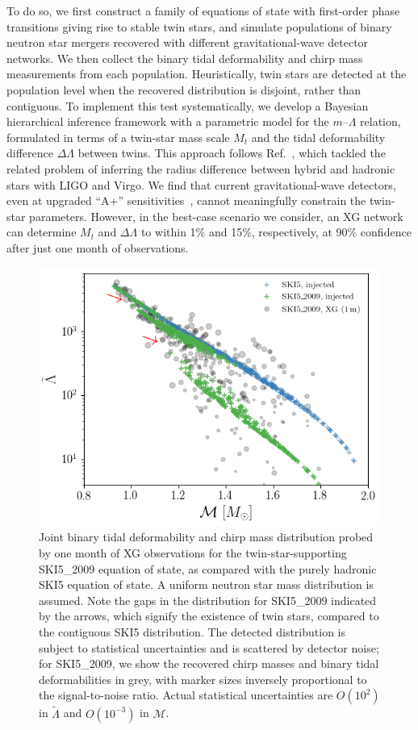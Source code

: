 \documentclass[aps,prd,twocolumn,superscriptaddress,nofootinbib]{revtex4-1}
\begin{document}
To do so, we first construct a family of equations of state with first-order phase transitions giving rise to stable twin stars, and simulate populations of binary neutron star mergers recovered with different gravitational-wave detector networks. We then collect the binary tidal deformability and chirp mass measurements from each population. Heuristically, twin stars are detected at the population level when the recovered distribution is disjoint, rather than contiguous. To implement this test systematically, we develop a Bayesian hierarchical inference framework with a parametric model for the $m$--$\Lambda$ relation, formulated in terms of a twin-star mass scale $M_t$ and the tidal deformability difference $\Delta\Lambda$ between twins. This approach follows Ref.~\cite{ChatziioannouHan2020}, which tackled the related problem of inferring the radius difference between hybrid and hadronic stars with LIGO and Virgo.
We find that current gravitational-wave detectors, even at upgraded ``A+'' sensitivities~\cite{AbbottAbbott2018_ObservingScenarios}, cannot meaningfully constrain the twin-star parameters. However, in the best-case scenario we consider, an XG network can determine $M_t$ and $\Delta\Lambda$ to within 1\% and 15\%, respectively, at 90\% confidence after just one month of observations.

\begin{figure}[t]
    \centering
    \includegraphics[width=0.95\columnwidth]{SKI52009_pop.png}
    \caption{Joint binary tidal deformability and chirp mass distribution probed by one month of XG observations for the twin-star-supporting SKI5\_2009 equation of state, as compared with the purely hadronic SKI5 equation of state. A uniform neutron star mass distribution is assumed. Note the gaps in the distribution for SKI5\_2009 indicated by the arrows, which signify the existence of twin stars, compared to the contiguous SKI5 distribution. The detected distribution is subject to statistical uncertainties and is scattered by detector noise; for SKI5\_2009, we show the recovered chirp masses and binary tidal deformabilities in grey, with marker sizes inversely proportional to the signal-to-noise ratio. Actual statistical uncertainties are $O(10^2)$ in $\tilde{\Lambda}$ and $O(10^{-3})$ in $\mathcal{M}$.}
    \label{fig:lambdapop}
\end{figure}
\end{document}
